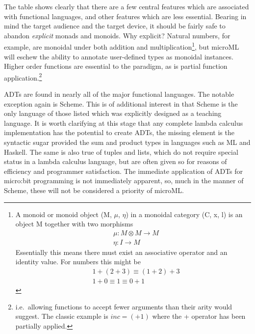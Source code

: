 \documentclass[12pt, a4paper]{report}
\begin{document}
The table shows clearly that there are a few central features which are associated with
functional languages, and other features which are less essential. Bearing in mind the target
audience and the target device, it should be fairly safe to abandon \textit{explicit} monads
and monoids. Why explicit? Natural numbers, for example, are monoidal under both addition and
multiplication\footnote{A monoid or monoid object (M, $\mu$, $\eta$) in a monoidal category (C, x,
l) is an object M together with two morphisms
\begin{align*}
    &\mu: M \otimes M \rightarrow M \\
    &\eta: I \rightarrow M
\end{align*}
Essentially this means there must exist an associative operator and an identity value. For numbers
this might be 
\begin{align*}
    &1 + (2 + 3) \equiv (1 + 2) + 3 \\
    &1 + 0 \equiv 1 \equiv 0 + 1
\end{align*}
}, but microML will eschew the ability to annotate user-defined types as monoidal instances. Higher
order functions are essential to the paradigm, as is partial function application.\footnote{i.e.\
allowing functions to accept fewer arguments than their arity would suggest. The classic example is
$inc = (+1)$ where the + operator has been partially applied.}

\gls{ADT}s are found in nearly all of the major functional languages. The notable
exception again is Scheme. This is of additional interest in that Scheme is the only language of
those listed which was explicitly designed as a teaching language. It is worth clarifying at this
stage that any complete lambda calculus implementation has the potential to create ADTs, the missing
element is the syntactic sugar provided the sum and product types in languages such as ML and
Haskell. The same is also true of tuples and lists, which do not require special status in a
lambda calculus language, but are often given so for reasons of efficiency and programmer
satisfaction. The immediate application of ADTs for micro:bit programming is not immediately
apparent, so, much in the manner of Scheme, these will not be considered a priority of microML\@.
\end{document}
